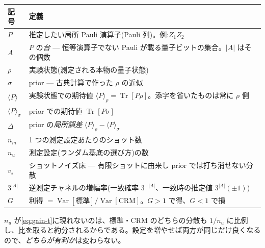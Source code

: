 \documentclass[11pt,a4paper]{ltjsarticle}
\newcommand{\ev}[1]{\langle #1\rangle}
\newcommand{\Tr}{\operatorname{Tr}}
\newcommand{\Var}{\operatorname{Var}}
\begin{document}
\begin{center}\small
\begin{tabular}{@{}ll@{}}
\toprule
記号 & 定義 \\
\midrule
$P$ & 推定したい局所 Pauli 演算子(Pauli 列)。例:$Z_1Z_2$ \\
$A$ & $P$ の\emph{台} --- 恒等演算子でない Pauli が載る量子ビットの集合。$|A|$ はその個数 \\
$\rho$ & 実験状態(測定される本物の量子状態) \\
$\sigma$ & prior --- 古典計算で作った $\rho$ の近似 \\
$\ev{P}$ & 実験状態での期待値 $\ev{P}_\rho=\Tr[P\rho]$。添字を省いたものは常に $\rho$ 側 \\
$\ev{P}_\sigma$ & prior での期待値 $\Tr[P\sigma]$ \\
$\Delta$ & prior の\emph{局所誤差} $\ev{P}_\rho-\ev{P}_\sigma$ \\
$n_m$ & 1 つの測定設定あたりのショット数 \\
$n_u$ & 測定設定(ランダム基底の選び方)の数 \\
$v_s$ & ショットノイズ床 --- 有限ショットに由来し prior では打ち消せない分散 \\
$3^{|A|}$ & 逆測定チャネルの増幅率(一致確率 $3^{-|A|}$、一致時の推定値 $3^{|A|}(\pm1)$) \\
$G$ & 利得 $=\Var[\text{標準}]/\Var[\text{CRM}]$。$G>1$ で得、$G<1$ で損 \\
\bottomrule
\end{tabular}
\end{center}

\noindent $n_u$ が\eqref{eq:gain-t}に現れないのは、標準・CRM のどちらの分散も $1/n_u$ に比例し、比を取ると約分されるからである。設定を増やせば両方が同じだけ良くなるので、\emph{どちらが有利か}は変わらない。
\end{document}
